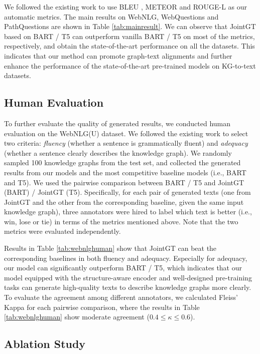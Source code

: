 \documentclass[11pt,a4paper]{article}
\begin{document}
We followed the existing work \cite{shimorina2018webnlgv2,chen2020bignn} to use BLEU \cite{papineni2002bleu}, METEOR \cite{banerjee2005meteor} and ROUGE-L \cite{lin2004rouge} as our automatic metrics. The main results on WebNLG, WebQuestions and PathQuestions are shown in Table \ref{tab:mainresult}. We can observe that JointGT based on BART / T5 can outperform vanilla BART / T5 on most of the metrics, respectively, and obtain the state-of-the-art performance on all the datasets. This indicates that our method can promote graph-text alignments and further enhance the performance of the state-of-the-art pre-trained models on KG-to-text datasets.


\subsection{Human Evaluation}

To further evaluate the quality of generated results, we conducted human evaluation on the WebNLG(U) dataset. We followed the existing work \cite{ferreira2019comparison,ribeiro2020globallocal} to select two criteria: \textit{fluency} (whether a sentence is grammatically fluent) and \textit{adequacy} (whether a sentence clearly describes the knowledge graph). We randomly sampled 100 knowledge graphs from the test set, and collected the generated results from our models and the most competitive baseline models (i.e., BART and T5). We used the pairwise comparison between BART / T5 and JointGT (BART) / JointGT (T5). Specifically, for each pair of generated texts (one from JointGT and the other from the corresponding baseline, given the same input knowledge graph), three annotators were hired to label which text is better (i.e., win, lose or tie) in terms of the metrics mentioned above. Note that the two metrics were evaluated independently.

Results in Table \ref{tab:webnlghuman} show that JointGT can beat the corresponding baselines in both fluency and adequacy. Especially for adequacy, our model can significantly outperform BART / T5, which indicates that our model equipped with the structure-aware encoder and well-designed pre-training tasks can generate high-quality texts to describe knowledge graphs more clearly. To evaluate the agreement among different annotators, we calculated Fleiss' Kappa \cite{fleiss1971kappa} for each pairwise comparison, where the results in Table \ref{tab:webnlghuman} show moderate agreement ($0.4\leq \kappa \leq 0.6$).


\subsection{Ablation Study}
\end{document}
